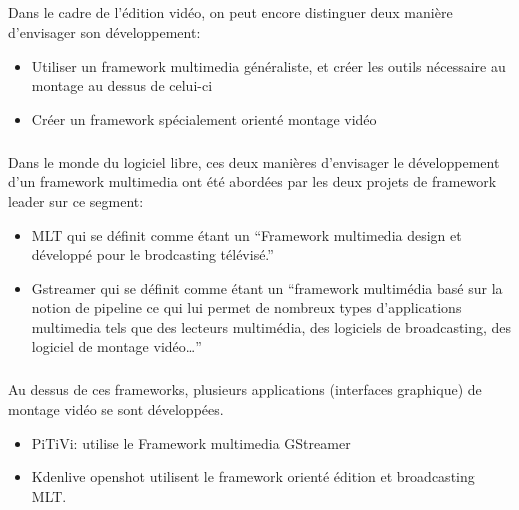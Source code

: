 \subparagraph{}

Dans le cadre de l'édition vidéo, on peut encore distinguer deux
manière d'envisager son développement:

\begin {itemize}

  \item {Utiliser un framework multimedia généraliste, et créer les
  outils nécessaire
         au montage au dessus de celui-ci} %

  \item {Créer un framework spécialement orienté montage vidéo}

\end {itemize}

\subparagraph{}

Dans le monde du logiciel libre, ces deux manières d'envisager le
développement d'un framework multimedia ont été abordées par les
deux projets de framework leader sur ce segment:

\begin {itemize}

  \item {MLT qui se définit comme étant un ``Framework multimedia design
    et développé pour le brodcasting télévisé.''}

  \item {Gstreamer qui se définit comme étant un ``framework multimédia
    basé sur la notion de pipeline ce qui lui permet de nombreux types
    d'applications multimedia tels que des lecteurs multimédia, des
    logiciels de broadcasting, des logiciel de montage vidéo\ldots''}

\end {itemize}

\subparagraph {}

Au dessus de ces frameworks, plusieurs applications (interfaces graphique)
de montage vidéo se sont développées.

\begin {itemize}

  \item {PiTiVi: utilise le Framework multimedia GStreamer}

  \item {Kdenlive openshot utilisent le framework
  orienté édition et broadcasting MLT.}

\end {itemize}

